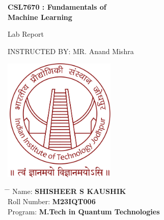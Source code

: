 \documentclass[12pt,a4paper,openany]{book} %
\title{}
\author{}
\date{}
\begin{document}
	
	\newcommand{\subf}[2]{%
		{\small\begin{tabular}[t]{@{}c@{}}
				#1\\#2
		\end{tabular}}%
	}
	
	\begin{titlepage}
		\begin{center}
			\vspace*{3cm}
			
			\Huge
			\textbf{CSL7670 : Fundamentals of \\Machine Learning}
			
			\vspace{0.3cm}
			\Huge
			Lab Report
			
			\vspace{0.8cm}
			\large
			
			INSTRUCTED BY: MR. Anand Mishra
			
			
			\vspace{0.5cm}
			\LARGE
			
			
			\vspace{1.5cm}
			
			\textbf{}
            \includegraphics[width=0.4\textwidth]{IITJ Logo__Small.jpeg}
			
			\vfill
			
			
			
			\vspace{0.8cm}
			
			
			
			\Large
			
			
			
			
		\end{center}
		\Large
		\begin{tabbing}
			\hspace*{1em}\= \hspace*{8em} \= \kill %
			\> Name:\>  \textbf{SHISHEER S KAUSHIK} \\
                \> Roll Number:\>  \textbf{M23IQT006} \\
                 \> Program:\>  \textbf{M.Tech in Quantum Technologies} \\
					\end{tabbing}
	\end{titlepage}
 
	
	
\end{document}
